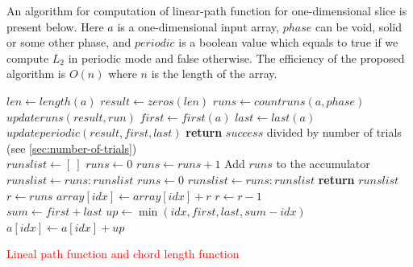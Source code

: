 \documentclass[reprint,amsmath,amssymb,aps,pre,showkeys,showpacs,nofootinbib]{revtex4-1}
\begin{document}
An algorithm for computation of linear-path function for one-dimensional slice
is present below. Here $a$ is a one-dimensional input array, $phase$ can be
void, solid or some other phase, and $periodic$ is a boolean value which equals
to true if we compute $L_2$ in periodic mode and false otherwise. The efficiency
of the proposed algorithm is $O(n)$ where $n$ is the length of the array.
\begin{algorithmic}[1]
    \State $len \gets length(a)$
    \State $result \gets zeros(len)$
    \State $runs \gets countruns(a, phase)$
      \State $updateruns(result, run)$
    \EndFor
      \State $first \gets first(a)$
      \State $last \gets last(a)$
        \State $updateperiodic(result, first, last)$
      \EndIf
    \EndIf
    \State \textbf{return} $success$ divided by number of trials
    (see \cref{sec:number-of-trials})
  \EndProcedure
  \\
    \State $runslist \gets [\ ]$
    \State $runs \gets 0$
        \State $runs \gets runs + 1$
        \Comment Add $runs$ to the accumulator
        \State $runslist \gets runs:runslist$
        \State $runs \gets 0$
      \EndIf
    \EndFor
      \State $runslist \gets runs:runslist$
    \EndIf
    \State \textbf{return} $runslist$
  \EndProcedure
  \\
    \State $r \gets runs$
      \State $array[idx] \gets array[idx] + r$
      \State $r \gets r - 1$
    \EndFor
  \EndProcedure
  \\
    \State $sum \gets first + last$
      \State $up \gets \min(idx, first, last, sum - idx)$
      \State $a[idx] \gets a[idx] + up$
    \EndFor
  \EndProcedure
\end{algorithmic}

\textcolor{red}{Lineal path function and chord length function}
\end{document}
